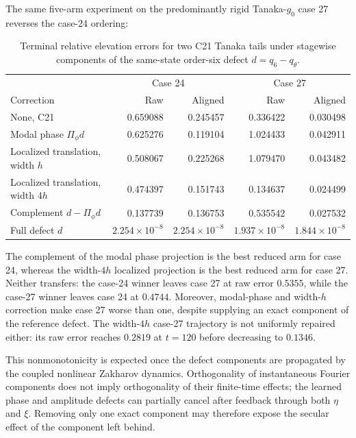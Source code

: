 \documentclass[11pt]{article}
\begin{document}
The same five-arm experiment on the predominantly rigid Tanaka-$g_0$
case 27 reverses the case-24 ordering:
\begin{table}[htbp]
\centering
\small
\begin{tabular}{lrrrr}
\toprule
& \multicolumn{2}{c}{Case 24} & \multicolumn{2}{c}{Case 27} \\
Correction & Raw & Aligned & Raw & Aligned \\
\midrule
None, C21                         & 0.659088 & 0.245457 & 0.336422 & 0.030498 \\
Modal phase $\Pi_\phi d$         & 0.625276 & 0.119104 & 1.024433 & 0.042911 \\
Localized translation, width $h$ & 0.508067 & 0.225268 & 1.079470 & 0.043482 \\
Localized translation, width $4h$
                                  & 0.474397 & 0.151743 & 0.134637 & 0.024499 \\
Complement $d-\Pi_\phi d$        & 0.137739 & 0.136753 & 0.535542 & 0.027532 \\
Full defect $d$                   &
$2.254{\times}10^{-8}$ & $2.254{\times}10^{-8}$ &
$1.937{\times}10^{-8}$ & $1.844{\times}10^{-8}$ \\
\bottomrule
\end{tabular}
\caption{Terminal relative elevation errors for two C21 Tanaka tails under
stagewise components of the same-state order-six defect
$d=q_6-q_\theta$.}
\label{tab:neutral-oracle-cross-case}
\end{table}

The complement of the modal phase projection is the best reduced arm for
case 24, whereas the width-$4h$ localized projection is the best reduced arm
for case 27.  Neither transfers: the case-24 winner leaves case 27 at raw error
$0.5355$, while the case-27 winner leaves case 24 at $0.4744$.
Moreover, modal-phase and width-$h$ correction make case 27 worse than one,
despite supplying an exact component of the reference defect.  The width-$4h$
case-27 trajectory is not uniformly repaired either: its raw error reaches
$0.2819$ at $t=120$ before decreasing to $0.1346$.

This nonmonotonicity is expected once the defect components are propagated by
the coupled nonlinear Zakharov dynamics.  Orthogonality of instantaneous
Fourier components does not imply orthogonality of their finite-time effects;
the learned phase and amplitude defects can partially cancel after feedback
through both $\eta$ and $\xi$.  Removing only one exact component may therefore
expose the secular effect of the component left behind.
\end{document}
